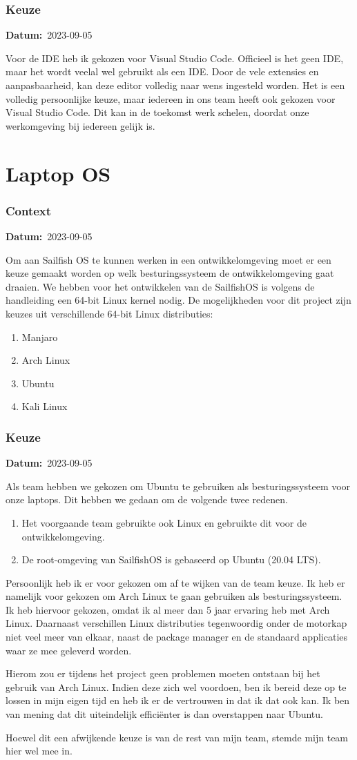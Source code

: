 \documentclass[a4paper]{report}
\newcommand{\personalbox}{
  \begin{tcolorbox}[hbox, colback=green!5!white,colframe=green!75!black,
    left=.1mm, right=.1mm, top=.1mm, bottom=.1mm, fontupper=\scriptsize\sffamily]
    Persoonlijke Keuze
  \end{tcolorbox}
}
\newcommand{\personalchoice}[1]{
  \section[ #1 ]{#1~\mbox{\raisebox{-2.5pt}{\personalbox}}}
}
\newcommand{\timestamp}[1]{
  \mbox{\scriptsize \textbf{Datum:} #1} \smallbreak
}
\begin{document}
\subsubsection{Keuze}
\timestamp{2023-09-05}
Voor de IDE heb ik gekozen voor Visual Studio Code. Officieel is het geen IDE, maar het wordt veelal wel gebruikt als een IDE. 
Door de vele extensies en aanpasbaarheid, kan deze editor volledig naar wens ingesteld worden. 
Het is een volledig persoonlijke keuze, maar iedereen in ons team heeft ook gekozen voor Visual Studio Code.
Dit kan in de toekomst werk schelen, doordat onze werkomgeving bij iedereen gelijk is.

\personalchoice{Laptop OS}
\subsubsection{Context}
\timestamp{2023-09-05}
Om aan Sailfish OS te kunnen werken in een ontwikkelomgeving moet er een keuze gemaakt worden op welk besturingssysteem de ontwikkelomgeving gaat draaien. We hebben voor het ontwikkelen van de SailfishOS is volgens de handleiding een 64-bit Linux kernel nodig.  
De mogelijkheden voor dit project zijn keuzes uit verschillende 64-bit Linux distributies: 
\begin{enumerate}
  \item Manjaro 
  \item Arch Linux
  \item Ubuntu
  \item Kali Linux
\end{enumerate}

\subsubsection{Keuze}
\timestamp{2023-09-05}
Als team hebben we gekozen om Ubuntu te gebruiken als besturingssysteem voor onze laptops. 
Dit hebben we gedaan om de volgende twee redenen.
\begin{enumerate}
  \item Het voorgaande team gebruikte ook Linux en gebruikte dit voor de ontwikkelomgeving.
  \item De root-omgeving van SailfishOS is gebaseerd op Ubuntu (20.04 LTS).
\end{enumerate}

Persoonlijk heb ik er voor gekozen om af te wijken van de team keuze. 
Ik heb er namelijk voor gekozen om Arch Linux te gaan gebruiken als besturingssysteem.
Ik heb hiervoor gekozen, omdat ik al meer dan 5 jaar ervaring heb met Arch Linux. 
Daarnaast verschillen Linux distributies tegenwoordig onder de motorkap niet veel meer van elkaar, naast de package manager en de standaard applicaties waar ze mee geleverd worden.
\par \smallskip
Hierom zou er tijdens het project geen problemen moeten ontstaan bij het gebruik van Arch Linux. 
Indien deze zich wel voordoen, ben ik bereid deze op te lossen in mijn eigen tijd en heb ik er de vertrouwen in dat ik dat ook kan.
Ik ben van mening dat dit uiteindelijk efficiënter is dan overstappen naar Ubuntu.
\par \smallskip
Hoewel dit een afwijkende keuze is van de rest van mijn team, stemde mijn team hier wel mee in.
\end{document}
